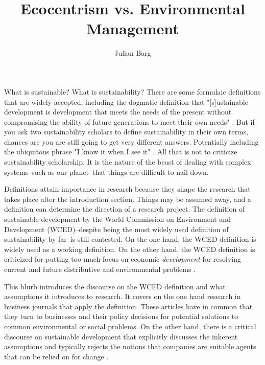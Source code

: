 \documentclass{article}
\title{Ecocentrism vs. Environmental Management}
\author{Julian Barg}
\begin{document}
	\maketitle

	What is sustainable? What is sustainability? There are some formulaic definitions that are widely accepted, including the dogmatic definition that "[s]ustainable development is development that meets the needs of the present without compromising the ability of future generations to meet their own needs" \citep[IV]{WCED1987}. But if you ask two sustainability scholars to define sustainability in their own terms, chances are you are still going to get very different answers. Potentially including the ubiquitous phrase "I know it when I see it" \citep{White2013}. All that is not to criticize sustainability scholarship. It is the nature of the beast of dealing with complex systems--such as our planet--that things are difficult to nail down.

	Definitions attain importance in research because they shape the research that takes place after the introduction section. Things may be assumed away, and a definition can determine the direction of a research project. The definition of sustainable development by the World Commission on Environment and Development (WCED)--despite being the most widely used definition of sustainability by far--is still contested. On the one hand, the WCED definition is widely used as a working definition. On the other hand, the WCED definition is criticized for putting too much focus on economic \textit{development} for resolving current and future distributive and environmental problems \citep[e.g.,][6f.]{Constanza2014a}.

	This blurb introduces the discourse on the WCED definition and what assumptions it introduces to research. It covers on the one hand research in business journals that apply the definition. These articles have in common that they turn to businesses and their policy decisions for potential solutions to common environmental or social problems. On the other hand, there is a critical 
	discourse on sustainable development that explicitly discusses the inherent assumptions and typically rejects the notions that companies are suitable agents that can be relied on for change \citep[e.g.,][]{Banerjee2003}.
\end{document}
